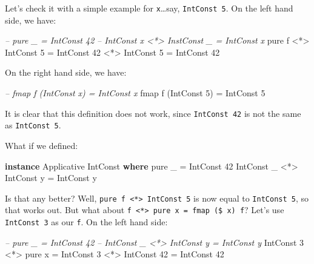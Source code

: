 \documentclass[]{article}
\newenvironment{Shaded}{}{}
\newcommand{\CommentTok}[1]{\textcolor[rgb]{0.38,0.63,0.69}{\textit{#1}}}
\newcommand{\DataTypeTok}[1]{\textcolor[rgb]{0.56,0.13,0.00}{#1}}
\newcommand{\DecValTok}[1]{\textcolor[rgb]{0.25,0.63,0.44}{#1}}
\newcommand{\FunctionTok}[1]{\textcolor[rgb]{0.02,0.16,0.49}{#1}}
\newcommand{\KeywordTok}[1]{\textcolor[rgb]{0.00,0.44,0.13}{\textbf{#1}}}
\newcommand{\NormalTok}[1]{#1}
\begin{document}
Let's check it with a simple example for \texttt{x}\ldots{}say,
\texttt{IntConst\ 5}. On the left hand side, we have:

\begin{Shaded}
\begin{Highlighting}[]
\CommentTok{-- pure _ = IntConst 42}
\CommentTok{-- IntConst x <*> InstConst _ = IntConst x}
\NormalTok{pure f }\FunctionTok{<*>} \DataTypeTok{IntConst} \DecValTok{5} \FunctionTok{=} \DataTypeTok{IntConst} \DecValTok{42} \FunctionTok{<*>} \DataTypeTok{IntConst} \DecValTok{5}
                      \FunctionTok{=} \DataTypeTok{IntConst} \DecValTok{42}
\end{Highlighting}
\end{Shaded}

On the right hand side, we have:

\begin{Shaded}
\begin{Highlighting}[]
\CommentTok{-- fmap f (IntConst x) = IntConst x}
\NormalTok{fmap f (}\DataTypeTok{IntConst} \DecValTok{5}\NormalTok{) }\FunctionTok{=} \DataTypeTok{IntConst} \DecValTok{5}
\end{Highlighting}
\end{Shaded}

It is clear that this definition does not work, since \texttt{IntConst\ 42} is
not the same as \texttt{IntConst\ 5}.

What if we defined:

\begin{Shaded}
\begin{Highlighting}[]
\KeywordTok{instance} \DataTypeTok{Applicative} \DataTypeTok{IntConst} \KeywordTok{where}
\NormalTok{    pure _ }\FunctionTok{=} \DataTypeTok{IntConst} \DecValTok{42}
    \DataTypeTok{IntConst}\NormalTok{ _ }\FunctionTok{<*>} \DataTypeTok{IntConst}\NormalTok{ y }\FunctionTok{=} \DataTypeTok{IntConst}\NormalTok{ y}
\end{Highlighting}
\end{Shaded}

Is that any better? Well,
\texttt{pure\ f\ \textless{}*\textgreater{}\ IntConst\ 5} is now equal to
\texttt{IntConst\ 5}, so that works out. But what about
\texttt{f\ \textless{}*\textgreater{}\ pure\ x\ =\ fmap\ (\$\ x)\ f}? Let's use
\texttt{IntConst\ 3} as our \texttt{f}. On the left hand side:

\begin{Shaded}
\begin{Highlighting}[]
\CommentTok{-- pure _ = IntConst 42}
\CommentTok{-- IntConst _ <*> IntConst y = IntConst y}
\DataTypeTok{IntConst} \DecValTok{3} \FunctionTok{<*>}\NormalTok{ pure x }\FunctionTok{=} \DataTypeTok{IntConst} \DecValTok{3} \FunctionTok{<*>} \DataTypeTok{IntConst} \DecValTok{42}
                      \FunctionTok{=} \DataTypeTok{IntConst} \DecValTok{42}
\end{Highlighting}
\end{Shaded}
\end{document}
